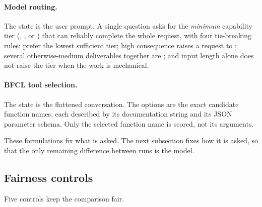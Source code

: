 \documentclass[11pt,a4paper]{article}
\begin{document}
\paragraph{Model routing.} The state is the user prompt. A single  question asks for the
\emph{minimum} capability tier (, , or ) that can reliably complete
the whole request, with four tie-breaking rules: prefer the lowest sufficient tier; high consequence
raises a request to ; several otherwise-medium deliverables together are ; and
input length alone does not raise the tier when the work is mechanical.

\paragraph{BFCL tool selection.} The state is the flattened conversation. The options are the exact
candidate function names, each described by its documentation string and its JSON parameter schema.
Only the selected function name is scored, not its arguments.

These formulations fix what is asked. The next subsection fixes how it is asked, so that the only
remaining difference between runs is the model.

\subsection{Fairness controls}\label{sec:fairness}

Five controls keep the comparison fair.
\end{document}
